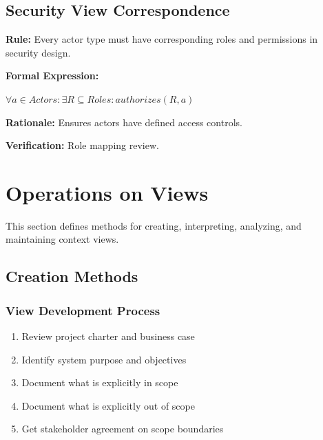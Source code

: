 \documentclass[11pt,letterpaper]{article}
\begin{document}
\subsection{Security View Correspondence}

\begin{definitionbox}
\textbf{Rule:} Every actor type must have corresponding roles and permissions in security design.

\textbf{Formal Expression:}
\begin{center}
$\forall a \in Actors : \exists R \subseteq Roles : authorizes(R, a)$
\end{center}

\textbf{Rationale:} Ensures actors have defined access controls.

\textbf{Verification:} Role mapping review.
\end{definitionbox}

\section{Operations on Views}

This section defines methods for creating, interpreting, analyzing, and maintaining context views.

\subsection{Creation Methods}

\subsubsection{View Development Process}

\begin{guidancebox}
\begin{enumerate}[nosep]
    \item Review project charter and business case
    \item Identify system purpose and objectives
    \item Document what is explicitly in scope
    \item Document what is explicitly out of scope
    \item Get stakeholder agreement on scope boundaries
\end{enumerate}
\end{guidancebox}
\end{document}
